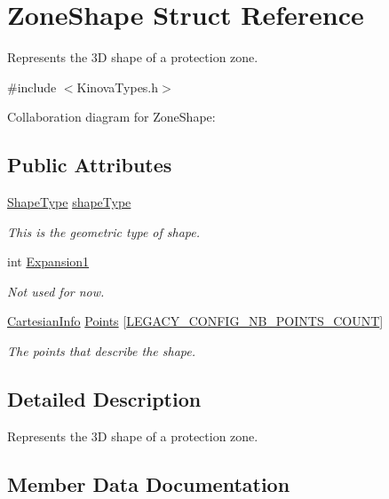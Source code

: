 \hypertarget{struct_zone_shape}{}\section{Zone\+Shape Struct Reference}
\label{struct_zone_shape}


Represents the 3D shape of a protection zone.  




{\ttfamily \#include $<$Kinova\+Types.\+h$>$}



Collaboration diagram for Zone\+Shape\+:
\subsection*{Public Attributes}
\begin{DoxyCompactItemize}
\item 
\hyperlink{_kinova_types_8h_a5a4538eeab397888d88a4eefcc5a1345}{Shape\+Type} \hyperlink{struct_zone_shape_aeeded22d6312c356295b896f5e42805a}{shape\+Type}
\begin{DoxyCompactList}\small\item\em This is the geometric type of shape. \end{DoxyCompactList}\item 
int \hyperlink{struct_zone_shape_a832ceb07cfc73a4cddb499228892b13d}{Expansion1}
\begin{DoxyCompactList}\small\item\em Not used for now. \end{DoxyCompactList}\item 
\hyperlink{struct_cartesian_info}{Cartesian\+Info} \hyperlink{struct_zone_shape_a49c0935a78506729b3f7143771ddc345}{Points} \mbox{[}\hyperlink{_kinova_types_8h_aa8172e4bdfdf0e0f563bed72e61083f6}{L\+E\+G\+A\+C\+Y\+\_\+\+C\+O\+N\+F\+I\+G\+\_\+\+N\+B\+\_\+\+P\+O\+I\+N\+T\+S\+\_\+\+C\+O\+U\+NT}\mbox{]}
\begin{DoxyCompactList}\small\item\em The points that describe the shape. \end{DoxyCompactList}\end{DoxyCompactItemize}


\subsection{Detailed Description}
Represents the 3D shape of a protection zone. 

\subsection{Member Data Documentation}
